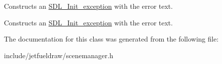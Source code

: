 Constructs an \hyperlink{classjetfuel_1_1draw_1_1exceptions_1_1SDL__Init__exception}{S\+D\+L\+\_\+\+Init\+\_\+exception} with the error text. 

Constructs an \hyperlink{classjetfuel_1_1draw_1_1exceptions_1_1SDL__Init__exception}{S\+D\+L\+\_\+\+Init\+\_\+exception} with the error text. 

The documentation for this class was generated from the following file\+:\begin{DoxyCompactItemize}
\item 
include/jetfueldraw/scenemanager.\+h\end{DoxyCompactItemize}
